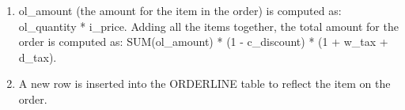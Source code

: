 \begin{enumerate}
\begin{enumerate}
        \item ol\_amount (the amount for the item in the order) is computed as: ol\_quantity * i\_price. Adding all the items together, the total amount for the order is computed as: SUM(ol\_amount) * (1 - c\_discount) * (1 + w\_tax + d\_tax).
        
        \item A new row is inserted into the ORDERLINE table to reflect the item on the order. 
        
    \end{enumerate}
\end{enumerate}
